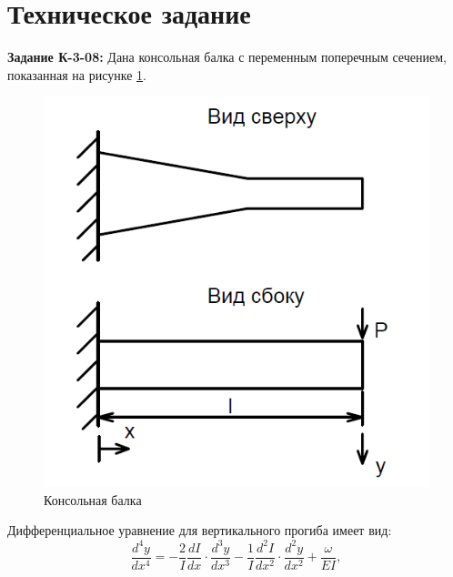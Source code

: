 





\section{Техническое задание}

\textbf{Задание К-3-08:} Дана консольная балка с переменным поперечным сечением, показанная на рисунке \ref{img:balka}.

\begin{figure}[H]
\begin{center}
	\vspace{-0.5cm}
	\includegraphics[scale=0.45]{balka}
	\caption{Консольная балка}
	\label{img:balka}
	\vspace{-0.5cm}
\end{center}
\end{figure}

Дифференциальное уравнение для вертикального прогиба имеет вид:
\begin{equation}\label{eq:diff}
	\frac{d^4y}{dx^4} = - \frac{2}{I} \frac{dI}{dx}\cdot \frac{d^3y}{dx^3} -  \frac{1}{I} \frac{d^2I}{dx^2}\cdot \frac{d^2y}{dx^2} + \frac{\omega}{EI},
\end{equation}

